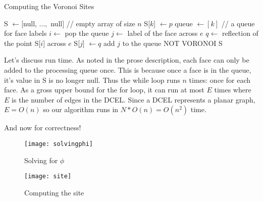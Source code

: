 \documentclass[11pt]{article}
\begin{document}
\begin{algorithm}
\caption{Computing the Voronoi Sites}
\label{alg:voronoisites}
    \begin{algorithmic}[1]
        \State S $\gets [$null, $\ldots, $ null$]$ // empty array of size $n$
        \State S[$k$] $\gets p$
        \State queue $\gets [ k ]$  // a queue for face labels
            \State $i \gets$ pop the queue
                \State $j \gets $ label of the face across $e$
                \State $q \gets $ reflection of the point S[$i$] across $e$
                    \State S[$j$] $\gets q$
                    \State add $j$ to the queue
                    \State \Return NOT VORONOI
                \EndIf
            \EndFor
        \EndWhile
        \State \Return S
    \EndFunction
    \end{algorithmic}
\end{algorithm}

Let's discuss run time.
As noted in the prose description, each face can only be added to the processing queue once.
This is because once a face is in the queue, it's value in S is no longer null.
Thus the while loop runs $n$ times: once for each face.
As a gross upper bound for the for loop, it can run at most $E$ times where $E$ is the number of edges in the DCEL.
Since a DCEL represents a planar graph, $E = O(n)$ so our algorithm runs in $N * O(n) = O(n^2)$ time.

And now for correctness!

\begin{figure}[h]
    \centering
    \texttt{[image: solvingphi]}
    \label{fig:solvingphi}
    \caption{Solving for $\phi$}
\end{figure}

\begin{figure}[h]
    \centering
    \texttt{[image: site]}
    \label{fig:site}
    \caption{Computing the site}
\end{figure}
\end{document}
